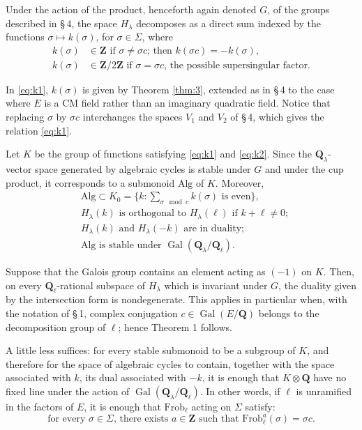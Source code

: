 \documentclass[11pt,a4paper]{article}
\theoremstyle{plain}
\theoremstyle{definition}
\DeclareMathOperator{\Gal}{Gal}
\begin{document}
Under the action of the product, henceforth again denoted $G$, of the groups described in \S\,4, the space $H_\lambda$ decomposes as a direct sum indexed by the functions $\sigma \mapsto k(\sigma)$, for $\sigma \in \Sigma$, where
\begin{align}
k(\sigma) &\in \mathbf{Z} \text{ if } \sigma \neq \sigma c \text{; then } k(\sigma c) = -k(\sigma), \label{eq:k1}\\
k(\sigma) &\in \mathbf{Z}/2\mathbf{Z} \text{ if } \sigma = \sigma c \text{, the possible supersingular factor.} \label{eq:k2}
\end{align}

In \eqref{eq:k1}, $k(\sigma)$ is given by Theorem \ref{thm:3}, extended as in \S\,4 to the case where $E$ is a CM field rather than an imaginary quadratic field. Notice that replacing $\sigma$ by $\sigma c$ interchanges the spaces $V_1$ and $V_2$ of \S\,4, which gives the relation \eqref{eq:k1}.

Let $K$ be the group of functions satisfying \eqref{eq:k1} and \eqref{eq:k2}. Since the $\mathbf{Q}_\lambda$-vector space generated by algebraic cycles is stable under $G$ and under the cup product, it corresponds to a submonoid $\mathrm{Alg}$ of $K$. Moreover,
\begin{align}
&\mathrm{Alg} \subset K_0 = \{k : \sum_{\sigma \mod c} k(\sigma) \text{ is even}\}, \label{eq:alg1}\\
&H_\lambda(k) \text{ is orthogonal to } H_\lambda(\ell) \text{ if } k + \ell \neq 0; \label{eq:alg2}\\
&H_\lambda(k) \text{ and } H_\lambda(-k) \text{ are in duality;} \label{eq:alg3}\\
&\mathrm{Alg} \text{ is stable under } \Gal(\mathbf{Q}_\lambda/\mathbf{Q}_\ell). \label{eq:alg4}
\end{align}

Suppose that the Galois group contains an element acting as $(-1)$ on $K$. Then, on every $\mathbf{Q}_\ell$-rational subspace of $H_\lambda$ which is invariant under $G$, the duality given by the intersection form is nondegenerate. This applies in particular when, with the notation of \S\,1, complex conjugation $c \in \Gal(E/\mathbf{Q})$ belongs to the decomposition group of $\ell$; hence Theorem 1 follows.

A little less suffices: for every stable submonoid to be a subgroup of $K$, and therefore for the space of algebraic cycles to contain, together with the space associated with $k$, its dual associated with $-k$, it is enough that $K \otimes \mathbf{Q}$ have no fixed line under the action of $\Gal(\mathbf{Q}_\lambda/\mathbf{Q}_\ell)$. In other words, if $\ell$ is unramified in the factors of $E$, it is enough that $\mathrm{Frob}_\ell$ acting on $\Sigma$ satisfy:
\[
\text{for every } \sigma \in \Sigma\text{, there exists } a \in \mathbf{Z} \text{ such that } \mathrm{Frob}_\ell^a(\sigma) = \sigma c .
\]
\end{document}
